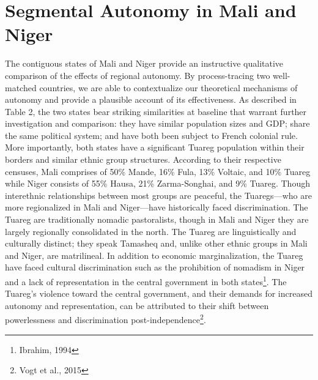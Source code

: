 \documentclass[12pt]{article}
\begin{document}
\section{Segmental Autonomy in Mali and Niger}
The contiguous states of Mali and Niger provide an instructive qualitative comparison of the effects of regional autonomy. By process-tracing two well-matched countries, we are able to contextualize our theoretical mechanisms of autonomy and provide a plausible account of its effectiveness. As described in Table 2, the two states bear striking similarities at baseline that warrant further investigation and comparison: they have similar population sizes and GDP; share the same political system; and have both been subject to French colonial rule. More importantly, both states have a significant Tuareg population within their borders and similar ethnic group structures. According to their respective censuses, Mali comprises of 50\% Mande, 16\% Fula, 13\% Voltaic, and 10\% Tuareg while Niger consists of 55\% Hausa, 21\% Zarma-Songhai, and 9\% Tuareg. Though interethnic relationships between most groups are peaceful, the Tuaregs---who are more regionalized in Mali and Niger---have historically faced discrimination. The Tuareg are traditionally nomadic pastoralists, though in Mali and Niger they are largely regionally consolidated in the north. The Tuareg are linguistically and culturally distinct; they speak Tamasheq and, unlike other ethnic groups in Mali and Niger, are matrilineal. In addition to economic marginalization, the Tuareg have faced cultural discrimination such as the prohibition of nomadism in Niger and a lack of representation in the central government in both states\footnote{Ibrahim, 1994}. The Tuareg's violence toward the central government, and their demands for increased autonomy and representation, can be attributed to their shift between powerlessness and discrimination post-independence\footnote{Vogt et al., 2015}.  
\end{document}
